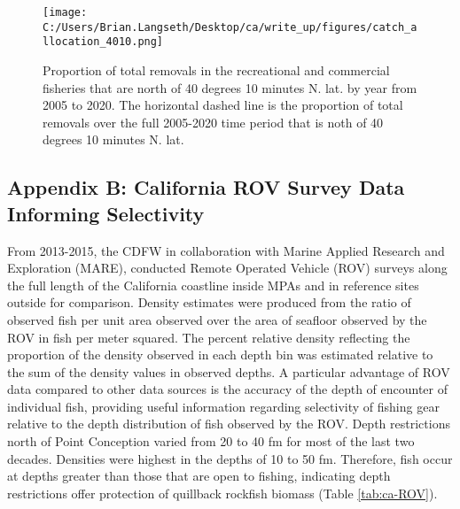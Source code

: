 \documentclass[11pt,
  english,
  letterpaper,
]{article}
\begin{document}
\leavevmode\tagmcend\tagstructend\par


\begin{figure}
\centering
\texttt{[image: C:/Users/Brian.Langseth/Desktop/ca/write\_up/figures/catch\_allocation\_4010.png]}
\caption{Proportion of total removals in the recreational and commercial fisheries that are north of 40 degrees 10 minutes N. lat. by year from 2005 to 2020. The horizontal dashed line is the proportion of total removals over the full 2005-2020 time period that is noth of 40 degrees 10 minutes N. lat.\label{fig:catch-4010}}
\end{figure}

\tagmcend\tagstructend

\clearpage


\hypertarget{append_b}{%
\subsection{Appendix B: California ROV Survey Data Informing Selectivity}\label{append_b}}

\leavevmode\tagmcend\tagstructend


From 2013-2015, the CDFW in collaboration with Marine Applied Research and Exploration (MARE), conducted Remote Operated Vehicle (ROV) surveys along the full length of the California coastline inside MPAs and in reference sites outside for comparison. Density estimates were produced from the ratio of observed fish per unit area observed over the area of seafloor observed by the ROV in fish per meter squared. The percent relative density reflecting the proportion of the density observed in each depth bin was estimated relative to the sum of the density values in observed depths. A particular advantage of ROV data compared to other data sources is the accuracy of the depth of encounter of individual fish, providing useful information regarding selectivity of fishing gear relative to the depth distribution of fish observed by the ROV. Depth restrictions north of Point Conception varied from 20 to 40 fm for most of the last two decades. Densities were highest in the depths of 10 to 50 fm. Therefore, fish occur at depths greater than those that are open to fishing, indicating depth restrictions offer protection of quillback rockfish biomass (Table \ref{tab:ca-ROV}).
\end{document}
